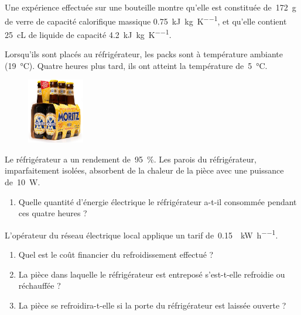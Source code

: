 	Une expérience effectuée sur une bouteille montre qu’elle est constituée de~\SI{172}{\gram} de verre de capacité calorifique massique \SI{0,75}{\kilo\joule\per\kilogram\per\kelvin}, et qu’elle contient \SI{25}{\centi\liter} de liquide de capacité \SI{4,2}{\kilo\joule\per\kilogram\per\kelvin}.
	
	Lorsqu’ils sont placés au réfrigérateur, les packs sont à température ambiante (\SI{19}{\degreeCelsius}). Quatre heures plus tard, ils ont atteint la température de~\SI{5}{\degreeCelsius}.
	
	\begin{figure}[htp] %
		\begin{center}
		\includegraphics[width=2.5cm]{images/6-pack.jpg}
		\end{center}
		\label{fig_six_pack}
	\end{figure}
	
	Le réfrigérateur a un rendement de~\SI{95}{\percent}. Les parois du réfrigérateur, imparfaitement isolées, absorbent de la chaleur de la pièce avec une puissance de~\SI{10}{\watt}.

	
	\begin{enumerate}
		\item Quelle quantité d’énergie électrique le réfrigérateur a-t-il consommée pendant ces quatre heures ?
	\end{enumerate}
	
	L’opérateur du réseau électrique local applique un tarif de~\SI[per-mode=symbol]{0,15}{\euroo\per\kilo\watt\per\hour}.
	
	\begin{enumerate}
		\item Quel est le coût financier du refroidissement effectué ?
		\item La pièce dans laquelle le réfrigérateur est entreposé s’est-t-elle refroidie ou réchauffée ?
		\item La pièce se refroidira-t-elle si la porte du réfrigérateur est laissée ouverte ?
	\end{enumerate}


